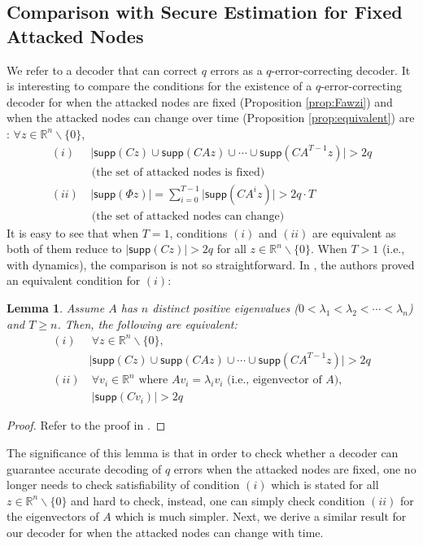 \documentclass[journal]{IEEEtran}
\newtheorem{lem}{\bf{Lemma}}
\begin{document}
\subsection{Comparison with Secure Estimation for Fixed Attacked Nodes}
We refer to a decoder that can correct $q$ errors as a $q$-error-correcting decoder.
It is interesting to compare the conditions for the existence of a $q$-error-correcting decoder for when the attacked nodes are fixed (Proposition \ref{prop:Fawzi}) and when the attacked nodes can change over time (Proposition \ref{prop:equivalent}) are :
$\forall z \in \mathbb{R}^n\backslash \{0 \}$,
\begin{equation}
\begin{aligned}
(i) &~  \lvert \textsf{supp}(Cz) \cup \textsf{supp}(CAz) \cup \cdots \cup \textsf{supp}(CA^{T-1} z) \rvert > 2q  \\& \text{ (the set of attacked nodes is fixed)}\\
(ii) & ~ \lvert \textsf{supp} (\Phi z) \rvert =  \sum_{i=0}^{T-1} \lvert \textsf{supp} (C A^i z) \rvert > 2 q \cdot T \\& \text{ (the set of attacked nodes can change)} 
\label{eq:connection}
\end{aligned}
\end{equation}
It is easy to see that when $T=1$, conditions $(i)$ and $(ii)$ are equivalent as both of them reduce to $\lvert \textsf{supp} (Cz) \rvert > 2q$ for all $z \in \mathbb{R}^n\backslash \{0 \}$.
When $T>1$ (i.e., with dynamics), the comparison is not so straightforward. In \cite{Fawzi2014}, the authors proved an equivalent condition for $(i)$:

\begin{lem} \label{lem:distinct}
Assume $A$ has $n$ distinct positive eigenvalues ($0<\lambda_1 < \lambda_2 <\cdots < \lambda_n$) and $T \geq n$. Then, the following are equivalent:
\begin{equation}
\begin{aligned}
 (i) &~ \forall z \in \mathbb{R}^n \backslash \{0\},  \\& \lvert \textsf{supp}(Cz) \cup \textsf{supp}(CAz) \cup \cdots \cup \textsf{supp}(CA^{T-1} z) \rvert > 2q  \\
 (ii)  &~\forall v_i \in \mathbb{R}^n \text{ where }   Av_i = \lambda_i v_i \text{ (i.e., eigenvector of $A$)},\\& ~ \lvert \textsf{supp}(Cv_i) \rvert > 2q \nonumber
\label{eq:condition}
\end{aligned}
\end{equation}
\end{lem}
\begin{proof} Refer to the proof in \cite{Fawzi2014}.
\end{proof}
\noindent
The significance of this lemma is that in order to check whether a decoder can guarantee accurate decoding of $q$ errors when the attacked nodes are fixed, one no longer needs to check satisfiability of condition $(i)$ which is stated for all $z \in \mathbb{R}^n \backslash \{0\}$ and hard to check, instead, one can simply check condition $(ii)$ for the eigenvectors of $A$ which is much simpler. Next, we derive a similar result for our decoder for when the attacked nodes can change with time.
\end{document}
